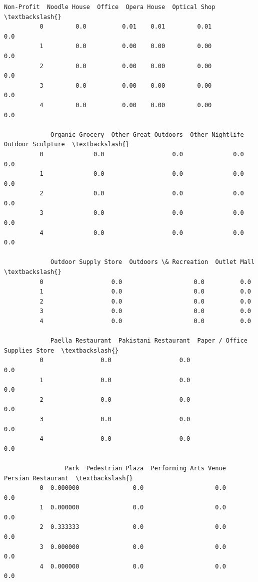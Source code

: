 \documentclass[11pt]{article}
\begin{document}
\begin{Verbatim}[commandchars=\\\{\}]
             Non-Profit  Noodle House  Office  Opera House  Optical Shop  \textbackslash{}
          0         0.0          0.01    0.01         0.01           0.0   
          1         0.0          0.00    0.00         0.00           0.0   
          2         0.0          0.00    0.00         0.00           0.0   
          3         0.0          0.00    0.00         0.00           0.0   
          4         0.0          0.00    0.00         0.00           0.0   
          
             Organic Grocery  Other Great Outdoors  Other Nightlife  Outdoor Sculpture  \textbackslash{}
          0              0.0                   0.0              0.0                0.0   
          1              0.0                   0.0              0.0                0.0   
          2              0.0                   0.0              0.0                0.0   
          3              0.0                   0.0              0.0                0.0   
          4              0.0                   0.0              0.0                0.0   
          
             Outdoor Supply Store  Outdoors \& Recreation  Outlet Mall  \textbackslash{}
          0                   0.0                    0.0          0.0   
          1                   0.0                    0.0          0.0   
          2                   0.0                    0.0          0.0   
          3                   0.0                    0.0          0.0   
          4                   0.0                    0.0          0.0   
          
             Paella Restaurant  Pakistani Restaurant  Paper / Office Supplies Store  \textbackslash{}
          0                0.0                   0.0                            0.0   
          1                0.0                   0.0                            0.0   
          2                0.0                   0.0                            0.0   
          3                0.0                   0.0                            0.0   
          4                0.0                   0.0                            0.0   
          
                 Park  Pedestrian Plaza  Performing Arts Venue  Persian Restaurant  \textbackslash{}
          0  0.000000               0.0                    0.0                 0.0   
          1  0.000000               0.0                    0.0                 0.0   
          2  0.333333               0.0                    0.0                 0.0   
          3  0.000000               0.0                    0.0                 0.0   
          4  0.000000               0.0                    0.0                 0.0   
          

\end{Verbatim}
\end{document}
